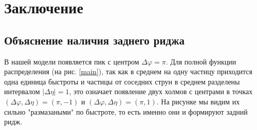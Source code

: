\documentclass[12pt]{article}
\renewcommand{\l}{\left( }
\renewcommand{\r}{\right) }
\renewcommand{\phi}{\varphi}
\newcommand{\br}[1]{\l {#1} \r}
\newcommand{\abs}[1]{\left| #1 \right|}
\begin{document}
\section{Заключение}

\subsection{Объяснение наличия заднего риджа}
В нашей модели появляется пик с центром $\Delta \phi = \pi$. Для полной функции распределения (на рис. \ref{main}), так как в среднем на одну частицу приходится одна единица быстроты и частицы от соседних струн в среднем разделены интервалом $\abs{\Delta \eta} = 1$, это означает появление двух холмов с центрами в точках $(\Delta \phi , \Delta \eta) = (\pi, -1)$ и $(\Delta \phi , \Delta \eta) = (\pi, 1)$. На рисунке мы видим их сильно "размазаными" по быстроте, то есть именно они и формируют задний ридж.
\appendix
\end{document}
